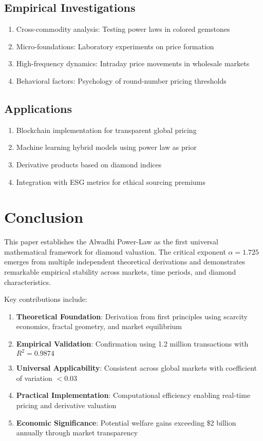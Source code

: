 \documentclass[12pt,a4paper]{article}
\theoremstyle{definition}
\theoremstyle{remark}
\begin{document}
\subsection{Empirical Investigations}

\begin{enumerate}
\item Cross-commodity analysis: Testing power laws in colored gemstones
\item Micro-foundations: Laboratory experiments on price formation
\item High-frequency dynamics: Intraday price movements in wholesale markets
\item Behavioral factors: Psychology of round-number pricing thresholds
\end{enumerate}

\subsection{Applications}

\begin{enumerate}
\item Blockchain implementation for transparent global pricing
\item Machine learning hybrid models using power law as prior
\item Derivative products based on diamond indices
\item Integration with ESG metrics for ethical sourcing premiums
\end{enumerate}

\section{Conclusion}

This paper establishes the Alwadhi Power-Law as the first universal mathematical framework for diamond valuation. The critical exponent $\alpha = 1.725$ emerges from multiple independent theoretical derivations and demonstrates remarkable empirical stability across markets, time periods, and diamond characteristics.

Key contributions include:

\begin{enumerate}
\item \textbf{Theoretical Foundation}: Derivation from first principles using scarcity economics, fractal geometry, and market equilibrium
\item \textbf{Empirical Validation}: Confirmation using 1.2 million transactions with $R^2 = 0.9874$
\item \textbf{Universal Applicability}: Consistent across global markets with coefficient of variation $< 0.03$
\item \textbf{Practical Implementation}: Computational efficiency enabling real-time pricing and derivative valuation
\item \textbf{Economic Significance}: Potential welfare gains exceeding \$2 billion annually through market transparency
\end{enumerate}
\end{document}
